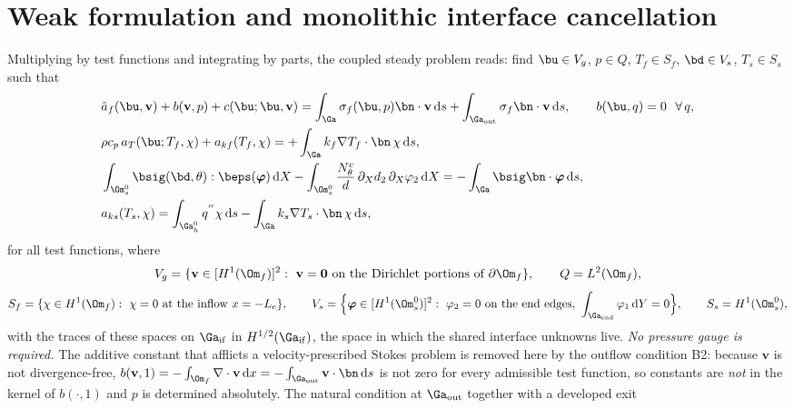 \section{Weak formulation and monolithic interface cancellation}
\label{sec:coupling}
Multiplying by test functions and integrating by parts, the coupled steady problem reads: find
$\bu\in V_g$, $p\in Q$, $T_f\in S_f$, $\bd\in V_s$, $T_s\in S_s$ such that
\begin{align}
&\hat a_f(\bu,\mathbf v)+b(\mathbf v,p)+c(\bu;\bu,\mathbf v)
=\int_{\Ga}\sigma_f(\bu,p)\bn\cdot\mathbf v\,\mathrm ds
+\int_{\Ga_{\mathrm{out}}}\sigma_f\bn\cdot\mathbf v\,\mathrm ds,
\qquad b(\bu,q)=0\ \ \forall\,q, \label{eq:weakf}\\
&\rho c_p\,a_T(\bu;T_f,\chi)+a_{kf}(T_f,\chi)
=+\int_{\Ga}k_f\nabla T_f\cdot\bn\,\chi\,\mathrm ds, \label{eq:weaktf}\\
&\int_{\Om_s^0}\bsig(\bd,\theta):\beps(\boldsymbol\varphi)\,\mathrm dX
-\int_{\Om_s^0}\frac{N_\theta^c}{d}\,\partial_X d_2\,\partial_X\varphi_2\,\mathrm dX
=-\int_{\Ga}\bsig\bn\cdot\boldsymbol\varphi\,\mathrm ds, \label{eq:weaks}\\
&a_{ks}(T_s,\chi)=\int_{\Ga_h^0}q^{''}\chi\,\mathrm ds
-\int_{\Ga}k_s\nabla T_s\cdot\bn\,\chi\,\mathrm ds , \label{eq:weakts}
\end{align}
for all test functions, where
\begin{equation*}
V_g=\{\mathbf v\in[H^1(\Om_f)]^2:\ \mathbf v=\mathbf 0\ \text{on the Dirichlet portions of }\partial\Om_f\},
\qquad Q=L^2(\Om_f),
\end{equation*}
\begin{equation*}
S_f=\{\chi\in H^1(\Om_f):\ \chi=0\ \text{at the inflow }x=-L_e\},\qquad
V_s=\Big\{\boldsymbol\varphi\in[H^1(\Om_s^0)]^2:\ \varphi_2=0\ \text{on the end edges},\
\int_{\Ga_{\mathrm{end}}}\varphi_1\,\mathrm dY=0\Big\},
\qquad S_s=H^1(\Om_s^0),
\end{equation*}
with the traces of these spaces on $\Ga_{\mathrm{if}}$ in $H^{1/2}(\Ga_{\mathrm{if}})$, the space in
which the shared interface unknowns live. \emph{No pressure gauge is required.} The additive
constant that afflicts a velocity-prescribed Stokes problem is removed here by the outflow condition
B2: because $\mathbf v$ is not divergence-free, $b(\mathbf v,1)=-\int_{\Om_f}\nabla\cdot\mathbf v
\,\mathrm dx=-\int_{\Ga_{\mathrm{out}}}\mathbf v\cdot\bn\,\mathrm ds$ is not zero for every
admissible test function, so constants are \emph{not} in the kernel of $b(\cdot,1)$ and $p$ is
determined absolutely. The natural condition at $\Ga_{\mathrm{out}}$ together with a developed exit

